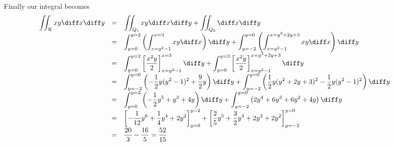 {Finally our integral becomes 
\[
\begin{array}{rcl}
\displaystyle \iint_{\mathcal R} xy\diff x \diff y&=&\displaystyle \iint_{Q_1}xy \diff x \diff y + \iint_{Q_2}\diff x\diff y \\
&=&\displaystyle \int_{y=0}^{y=2} \left(\int_{x=y^2-1}^{x=3} xy \diff x\right) \diff y+ \int_{y=-2}^{y=0} \left( \int_{x=y^2-1}^{x=y^2+2y+3} xy \diff x \right) \diff y\\
&=&\displaystyle \int_{y=0}^{y=2}\left[ \frac{x^2y}{2}\right]_{x=y^2-1}^{x=3}\diff y+ \int_{y=0}^{y=3}\left[ \frac{x^2y}{2}\right]_{x=y^2-1}^{x=y^2+2y+3}\diff y\\
&=&\displaystyle \int_{y=-2}^{y=0}  \left(-\frac{1}{2} y (y^{2}-1)^{2}+\frac{9}{2} y \right)\diff y  +\int_{y=-2}^{y=0}\left( \frac{1}{2} y (y^{2}+2 y+3)^{2}-\frac{1}{2} y (y^{2}-1)^{2}\right)\diff y\\
&=&\displaystyle\int_{y=0}^{y=2}  \left(-\frac{1}{2} y^{5}+y^{3}+4 y  \right)\diff y  +\int_{y=-2}^{y=0}\left( 2 y^{4}+6 y^{3}+6 y^{2}+4 y\right)\diff y\\
&=&\displaystyle \left[-\frac{1}{12} y^{6}+\frac{1}{4} y^{4}+2 y^{2}\right]_{y=0}^{y=2} +\left[\frac{2}{5} y^{5}+\frac{3}{2} y^{4}+2 y^{3}+2 y^{2} \right]_{y=-2}^{y=0}\\
&=&\displaystyle \frac{20}{3} -\frac{16}{5} =\frac{52}{15}
\end{array}
\]

}